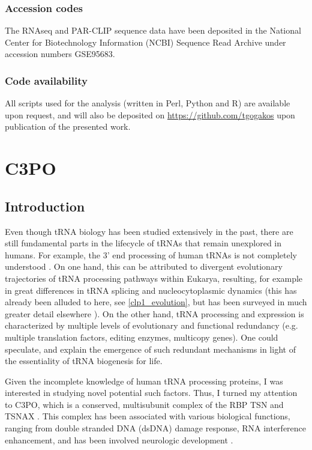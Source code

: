 \documentclass[12pt]{rockefeller}
\begin{document}
\section{Accession codes}
The RNAseq and PAR-CLIP sequence data have been deposited in the National Center for Biotechnology Information (NCBI) Sequence Read Archive under accession numbers GSE95683.

\section{Code availability}
All scripts used for the analysis (written in Perl, Python and R) are available upon request, and will also be deposited on \url{https://github.com/tgogakos} upon publication of the presented work.  

\part{C3PO}
\chapter{Introduction}
Even though tRNA biology has been studied extensively in the past, there are still fundamental parts in the lifecycle of tRNAs that remain unexplored in humans. For example, the 3' end processing of human tRNAs is not completely understood \cite{Maraia:2010kx}. On one hand, this can be attributed to divergent evolutionary trajectories of tRNA processing pathways within Eukarya, resulting, for example in great differences in tRNA splicing and nucleocytoplasmic dynamics (this has already been alluded to here, see \ref{clp1_evolution}, but has been surveyed in much greater detail elsewhere \cite{Hopper:2008ct, Hopper:2010ho, Phizicky:2010jf}). On the other hand, tRNA processing and expression is characterized by multiple levels of evolutionary and functional redundancy (e.g. multiple translation factors, editing enzymes, multicopy genes). One could speculate, and explain the emergence of such redundant mechanisms in light of the essentiality of tRNA biogenesis for life. 

Given the incomplete knowledge of human tRNA processing proteins, I was interested in studying novel potential such factors. Thus, I turned my attention to \gls{C3PO}, which is a conserved, multisubunit complex of the RBP \gls{TSN} and \gls{TSNAX} \cite{Liu:2009ce}. This complex has been associated with various biological functions, ranging from double stranded DNA (dsDNA) damage response, RNA interference enhancement, and has been involved neurologic development \cite{Aoki:1995ec, Ishida:2002td, Stein:2006jj, Claussen:2006in, Liu:2009ce}. 
	
\end{document}
